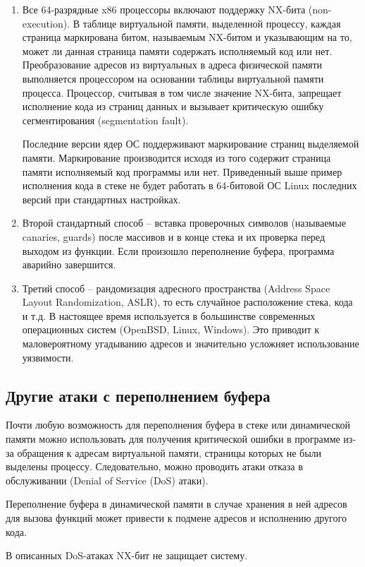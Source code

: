 \begin{enumerate}
    \item Все 64-разрядные x86 процессоры включают поддержку NX-бита (non-execution). В таблице виртуальной памяти, выделенной процессу, каждая страница маркирована битом, называемым NX-битом и указывающим на то, может ли данная страница памяти содержать исполняемый код или нет. Преобразование адресов из виртуальных в адреса физической памяти выполняется процессором на основании таблицы виртуальной памяти процесса. Процессор, считывая в том числе значение NX-бита, запрещает исполнение кода из страниц данных и вызывает критическую ошибку сегментирования (segmentation fault).

        Последние версии ядер ОС поддерживают маркирование страниц выделяемой памяти. Маркирование производится исходя из того содержит страница памяти исполняемый код программы или нет. Приведенный выше пример исполнения кода в стеке не будет работать в 64-битовой ОС Linux последних версий при стандартных настройках.

    \item Второй стандартный способ -- вставка проверочных символов (называемые canaries, guards) после массивов и в конце стека и их проверка перед выходом из функции. Если произошло переполнение буфера, программа аварийно завершится.

    \item Третий способ -- рандомизация адресного пространства (Address Space Layout Randomization, ASLR), то есть случайное расположение стека, кода и т.д. В настоящее время используется в большинстве современных операционных систем (OpenBSD, Linux, Windows). Это приводит к маловероятному угадыванию адресов и значительно усложняет использование уязвимости.
\end{enumerate}


\subsection{Другие атаки с переполнением буфера}

Почти любую возможность для переполнения буфера в стеке или динамической памяти можно использовать для получения критической ошибки в программе из-за обращения к адресам виртуальной памяти, страницы которых не были выделены процессу. Следовательно, можно проводить атаки отказа в обслуживании (Denial of Service (DoS) атаки).

Переполнение буфера в динамической памяти в случае хранения в ней адресов для вызова функций может привести к подмене адресов и исполнению другого кода.

В описанных DoS-атаках NX-бит не защищает систему.
